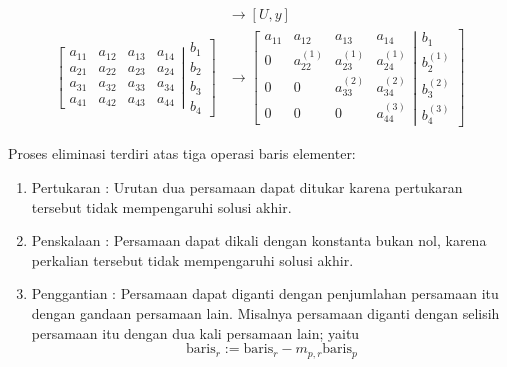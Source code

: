 \documentclass[pdflatex,compress,mathserif]{beamer}
\begin{document}
\begin{frame}
	\begin{align*}
	[A,b]
	&\rightarrow
	[U,y]
	\\
	\left[
	\begin{matrix}
	a_{11} & a_{12} & a_{13} & a_{14}\\
	a_{21} & a_{22} & a_{23} & a_{24}\\
	a_{31} & a_{32} & a_{33} & a_{34}\\
	a_{41} & a_{42} & a_{43} & a_{44}
	\end{matrix}
	\right|
	\left.
	\begin{matrix}
	b_{1}\\
	b_{2}\\
	b_{3}\\
	b_{4}
	\end{matrix}
	\right]
	&\rightarrow
	\left[
	\begin{matrix}
	a_{11} & a_{12} & a_{13} & a_{14}\\
	0 & a_{22}^{(1)} & a_{23}^{(1)} & a_{24}^{(1)}\\
	0 & 0 & a_{33}^{(2)} & a_{34}^{(2)}\\
	0 & 0 & 0 & a_{44}^{(3)}
	\end{matrix}
	\right|
	\left.
	\begin{matrix}
	b_{1}\\
	b_{2}^{(1)}\\
	b_{3}^{(2)}\\
	b_{4}^{(3)}
	\end{matrix}
	\right]
	\end{align*}
\end{frame}

\begin{frame}
	Proses eliminasi terdiri atas tiga operasi baris elementer:
	\begin{enumerate}
		\item Pertukaran : Urutan dua persamaan dapat ditukar karena pertukaran tersebut tidak mempengaruhi solusi akhir.
		\item Penskalaan : Persamaan dapat dikali dengan konstanta bukan nol, karena perkalian tersebut tidak mempengaruhi solusi akhir.
		\item Penggantian : Persamaan dapat diganti dengan penjumlahan persamaan itu dengan gandaan persamaan lain. Misalnya persamaan diganti dengan selisih persamaan itu dengan dua kali persamaan lain; yaitu
		\[ \text{baris}_r := \text{baris}_r - m_{p,r}\text{baris}_p \]
	\end{enumerate}
\end{frame}
\end{document}
